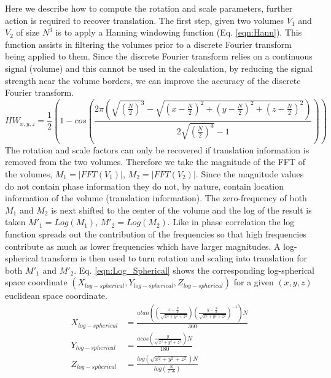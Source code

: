 Here we describe how to compute the rotation and scale parameters, further action is required to recover translation. The first step, given two volumes $V_1$ and $V_2$ of size $N^3$ is to apply a Hanning windowing function (Eq. \ref{eqn:Hann}). This function assists in filtering the volumes prior to a discrete Fourier transform being applied to them. Since the discrete Fourier transform relies on a continuous signal (volume) and this cannot be used in the calculation, by reducing the signal strength near the volume borders, we can improve the accuracy of the discrete Fourier transform.
\begin{equation} \label{eqn:Hann}
\scriptstyle
HW_{x,y,z} = \frac{1}{2}\left(
1 - cos \left(
\frac{2\pi
\left(
\sqrt{\left(\frac{N}{2}\right)^3} -
\sqrt{
\left(x-\frac{N}{2}\right)^2 + \left(y-\frac{N}{2}\right)^2 + \left(z-\frac{N}{2}\right)^2
}
\right)
}
{2\sqrt{\left(\frac{N}{2}\right)^3} - 1}
\right)
\right)
\end{equation}
The rotation and scale factors can only be recovered if translation information is removed from the two volumes. Therefore we take the magnitude of the FFT of the volumes, $M_1 = |FFT(V_1)|$, $M_2 = |FFT(V_2)|$. Since the magnitude values do not contain phase information they do not, by nature, contain location information of the volume (translation information). The zero-frequency of both $M_1$ and $M_2$ is next shifted to the center of the volume and the log of the result is taken $M'_1 = Log(M_1)$, $M'_2 = Log(M_2)$. Like in phase correlation the log function spreads out the contribution of the frequencies so that high frequencies contribute as much as lower frequencies which have larger magnitudes. A log-spherical transform is then used to turn rotation and scaling into translation for both $M'_1$ and $M'_2$. Eq. \ref{eqn:Log_Spherical} shows the corresponding log-spherical space coordinate $(X_{log-spherical}, Y_{log-spherical}, Z_{log-spherical})$ for a given $(x,y,z)$ euclidean space coordinate.
\begin{equation} \label{eqn:Log_Spherical}
\begin{split}
X_{log-spherical} & = \frac{atan\left(
\left(\frac{x-\frac{N}{2}}{\sqrt{x^2+y^2+z^2}}\right)
\left(\frac{y-\frac{N}{2}}{\sqrt{x^2+y^2+z^2}}\right)^{-1}
\right)N}{360}\\
Y_{log-spherical} & = \frac{acos\left(
\frac{y}{\sqrt{x^2+y^2+z^2}}
\right)N}
{180} \\
Z_{log-spherical} & =\frac{log\left(\sqrt{x^2+y^2+z^2}\right)N}{log\left( \frac{N}{2.56} \right)} \\
\end{split}
\end{equation}
